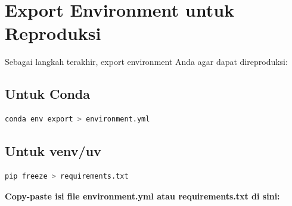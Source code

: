 \documentclass[11pt,a4paper]{article}
\begin{document}
\section{Export Environment untuk Reproduksi}
Sebagai langkah terakhir, export environment Anda agar dapat direproduksi:

\subsection{Untuk Conda}
\begin{lstlisting}[language=bash, caption=Export conda environment]
conda env export > environment.yml
\end{lstlisting}

\subsection{Untuk venv/uv}
\begin{lstlisting}[language=bash, caption=Export pip requirements]
pip freeze > requirements.txt
\end{lstlisting}

\textbf{Copy-paste isi file environment.yml atau requirements.txt di sini:}
\end{document}
